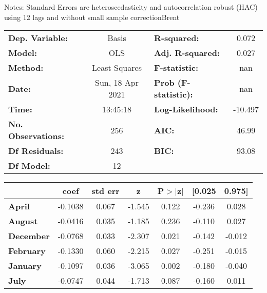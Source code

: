 Notes: \newline
 [1] Standard Errors are heteroscedasticity and autocorrelation robust (HAC) using 12 lags and without small sample correctionBrent\begin{center}
\begin{tabular}{lclc}
\toprule
\textbf{Dep. Variable:}    &      Basis       & \textbf{  R-squared:         } &     0.072   \\
\textbf{Model:}            &       OLS        & \textbf{  Adj. R-squared:    } &     0.027   \\
\textbf{Method:}           &  Least Squares   & \textbf{  F-statistic:       } &       nan   \\
\textbf{Date:}             & Sun, 18 Apr 2021 & \textbf{  Prob (F-statistic):} &      nan    \\
\textbf{Time:}             &     13:45:18     & \textbf{  Log-Likelihood:    } &   -10.497   \\
\textbf{No. Observations:} &         256      & \textbf{  AIC:               } &     46.99   \\
\textbf{Df Residuals:}     &         243      & \textbf{  BIC:               } &     93.08   \\
\textbf{Df Model:}         &          12      & \textbf{                     } &             \\
\bottomrule
\end{tabular}
\begin{tabular}{lcccccc}
                   & \textbf{coef} & \textbf{std err} & \textbf{z} & \textbf{P$> |$z$|$} & \textbf{[0.025} & \textbf{0.975]}  \\
\midrule
\textbf{April}     &      -0.1038  &        0.067     &    -1.545  &         0.122        &       -0.236    &        0.028     \\
\textbf{August}    &      -0.0416  &        0.035     &    -1.185  &         0.236        &       -0.110    &        0.027     \\
\textbf{December}  &      -0.0768  &        0.033     &    -2.307  &         0.021        &       -0.142    &       -0.012     \\
\textbf{February}  &      -0.1330  &        0.060     &    -2.215  &         0.027        &       -0.251    &       -0.015     \\
\textbf{January}   &      -0.1097  &        0.036     &    -3.065  &         0.002        &       -0.180    &       -0.040     \\
\textbf{July}      &      -0.0747  &        0.044     &    -1.713  &         0.087        &       -0.160    &        0.011     \\

\end{tabular}
\end{center}
